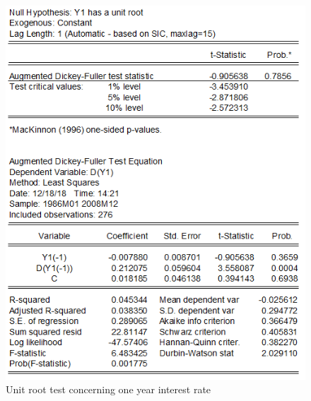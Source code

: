 \documentclass[12pt]{article}
\begin{document}
\begin{figure}[H]
\centering
\includegraphics[scale=1.2]{y1_unit_root_test.PNG} 
\caption{Unit root test concerning one year interest rate \label{fig:y1unitroot} }
\end{figure}
\end{document}
